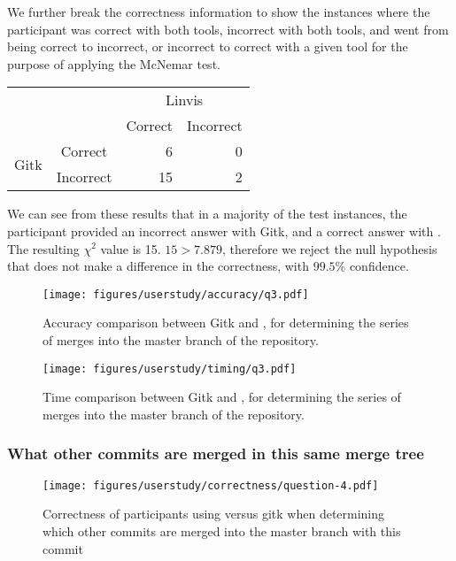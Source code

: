 We further break the correctness information to show the instances where
the participant was correct with both tools, incorrect with both tools,
and went from being correct to incorrect, or incorrect to correct with a
given tool for the purpose of applying the McNemar test.

\begin{center}
  \begin{tabular}{cc|rr}
                           &           & \multicolumn{2}{c}{Linvis}\\
                           &           & Correct                      & Incorrect\\\hline
    \multirow{2}{*}{Gitk}  & Correct   & 6                            & 0\\
                           & Incorrect & 15                           & 2\\
  \end{tabular}
\end{center}

We can see from these results that in a majority of the test instances,
the participant provided an incorrect answer with Gitk, and a correct
answer with \tool. The resulting $\chi^2$ value is 15. $15 > 7.879$,
therefore we reject the null hypothesis that \tool does not make a
difference in the correctness, with $99.5\%$ confidence.

\begin{figure}[htpb]
  \centering
  \texttt{[image: figures/userstudy/accuracy/q3.pdf]}
  \caption{Accuracy comparison between Gitk and \tool, for determining
    the series of merges into the master branch of the repository.}
  \label{fig:q3_accuracy}
\end{figure}

\begin{figure}[htpb]
  \centering
  \texttt{[image: figures/userstudy/timing/q3.pdf]}
  \caption{Time comparison between Gitk and \tool, for determining
    the series of merges into the master branch of the repository.}
  \label{fig:q3_timing}
\end{figure}

\subsubsection{What other commits are merged in this same merge tree}
\label{ssub:what_other_commits_are_merged_in_this_same_merge_tree}

\begin{figure}[htpb]
  \centering
  \texttt{[image: figures/userstudy/correctness/question-4.pdf]}
  \caption{Correctness of participants using \tool versus gitk when
    determining which other commits are merged into the master branch
    with this commit}
  \label{fig:q_4_correctness}
\end{figure}

